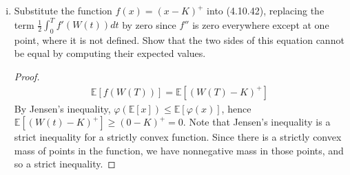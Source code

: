 \documentclass{article}
\newcommand{\E}{\mathbb{E}}
\theoremstyle{definition}
\theoremstyle{definition}
\begin{document}
\begin{enumerate}
\begin{enumerate}[(i)]
        \begin{proof}
        
            Since the $+$ superscript denotes the positive part of $(x-K)$, we can rewrite:
        \begin{align*}
             f(x) = \begin{cases} (x-K) \text{ if } x\geq K \\
            0 \hspace{1cm} \text{ if } x < K
            \end{cases} 
        \end{align*}
        Hence the we can compute the derivative piecewise:
        \begin{align*}
             f'(x) = \begin{cases} 1 \text{ if } x> K \\
            0 \text{ if } x < K
            \end{cases} 
        \end{align*}
        
        At $x=K$, the derivative from the left limit is $0$, while the derivative from the right is $1$, hence the limit is undefined at that point. Similarly,
        \begin{align*}
             f''(x) = \begin{cases} 0 \text{ if } x > K \\
            0  \text{ if } x < K
            \end{cases} 
        \end{align*}
        where $f''(x)$ is undefined at $x=K$ since the first derivative is undefined at that point, it must be that the second derivative is undefined at that point as well.
        
        \end{proof}
        
        \item Substitute the function $f(x) = (x-K)^+$ into (4.10.42), replacing the term $\frac{1}{2} \int_0^T f'(W(t))dt$ by zero since $f''$ is zero everywhere except at one point, where it is not defined. Show that the two sides of this equation cannot be equal by computing their expected values.
        
        \begin{proof}
        \begin{align*}
            \E[f(W(T))] = \E\left[ (W(T)-K)^+ \right] 
        \end{align*}
        By Jensen's inequality, $\varphi(\E[x])\leq \E[\varphi(x)]$, hence $\E[(W(t)-K)^+]\geq (0-K)^+=0$. Note that Jensen's inequality is a strict inequality for a strictly convex function. Since there is a strictly convex mass of points in the function, we have nonnegative mass in those points, and so a strict inequality.
        

\end{proof}
\end{enumerate}
\end{enumerate}
\end{document}
